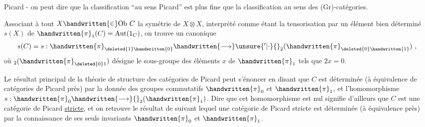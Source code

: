 
Picard - on peut dire que la classification ``au sens Picard'' est plus fine que la classification au sens des (Gr)-catégories. 

Associant à tout $X\handwritten{\in}\mathrm{Ob}\ C$ la symétrie de $X\otimes X$, interprété comme  étant la tensorisation par un élément bien déterminé $s(X)$ de $\handwritten{\pi}_{1}(C)=\mathrm{Aut}(1_C)$, on trouve un  canonique
\[
s(C)=s:\handwritten{\pi}_{\deleted{1}\handwritten{0}}\handwritten{\longrightarrow}\unsure{{}'|\cdot}{}_{2}(\handwritten{\pi}_{\deleted{0}\handwritten{1}})\ ,
\]
où $ {}_{2}(\handwritten{\pi}_{\deleted{0}1})$ désigne le sous-groupe des éléments $x$ de $\handwritten{\pi}_{1}$ tels que $2x=0$.

Le résultat principal de la théorie de structure des catégories de Picard peut s'énoncer en disant que $C$ est déterminée (à équivalence  de catégories de Picard près) par la donnée des groupes commutatifs $\handwritten{\pi}_{0}$ et $\handwritten{\pi}_{1}$, et l'homomorphisme $s:\handwritten{\pi}_{0}\handwritten{\longrightarrow}{}_{2}(\handwritten{\pi}_{1})$. Dire que cet homomorphisme est nul signifie d'ailleurs que $C$ est une catégorie de Picard \uline{stricte}, et on retrouve le résultat de \handwritten{[\, ]} suivant lequel une catégorie de Picard stricte est déterminée (à équivalence près) par la connaissance de ses seuls invariants $\handwritten{\pi}_{0}$ et $\handwritten{\pi}_{1}$.

